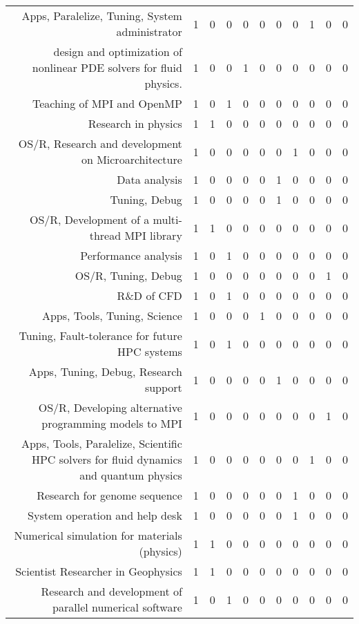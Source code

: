 {\begin{landscape}
\begin{longtable}[htb]{r|c|c|c|c|c|c|c|c|c|c}
{Apps, Paralelize, Tuning, System administrator} & 1 & 0 & 0 & 0 & 0 & 0 & 0 & 1 & 0 & 0 \\%
{design and optimization of nonlinear PDE solvers for fluid physics.} & 1 & 0 & 0 & 1 & 0 & 0 & 0 & 0 & 0 & 0 \\%
{Teaching of MPI and OpenMP} & 1 & 0 & 1 & 0 & 0 & 0 & 0 & 0 & 0 & 0 \\%
{Research in physics} & 1 & 1 & 0 & 0 & 0 & 0 & 0 & 0 & 0 & 0 \\%
{OS/R, Research and development on Microarchitecture} & 1 & 0 & 0 & 0 & 0 & 0 & 1 & 0 & 0 & 0 \\%
{Data analysis} & 1 & 0 & 0 & 0 & 0 & 1 & 0 & 0 & 0 & 0 \\%
{Tuning, Debug} & 1 & 0 & 0 & 0 & 0 & 1 & 0 & 0 & 0 & 0 \\%
{OS/R, Development of a  multi-thread MPI library} & 1 & 1 & 0 & 0 & 0 & 0 & 0 & 0 & 0 & 0 \\%
{Performance analysis} & 1 & 0 & 1 & 0 & 0 & 0 & 0 & 0 & 0 & 0 \\%
{OS/R, Tuning, Debug} & 1 & 0 & 0 & 0 & 0 & 0 & 0 & 0 & 1 & 0 \\%
{R\&D of CFD} & 1 & 0 & 1 & 0 & 0 & 0 & 0 & 0 & 0 & 0 \\%
{Apps, Tools, Tuning, Science} & 1 & 0 & 0 & 0 & 1 & 0 & 0 & 0 & 0 & 0 \\%
{Tuning, Fault-tolerance for future HPC systems} & 1 & 0 & 1 & 0 & 0 & 0 & 0 & 0 & 0 & 0 \\%
{Apps, Tuning, Debug, Research support} & 1 & 0 & 0 & 0 & 0 & 1 & 0 & 0 & 0 & 0 \\%
{OS/R, Developing alternative programming models to MPI} & 1 & 0 & 0 & 0 & 0 & 0 & 0 & 0 & 1 & 0 \\%
{Apps, Tools, Paralelize, Scientific HPC solvers for fluid dynamics and quantum physics} & 1 & 0 & 0 & 0 & 0 & 0 & 0 & 1 & 0 & 0 \\%
{Research for genome sequence} & 1 & 0 & 0 & 0 & 0 & 0 & 1 & 0 & 0 & 0 \\%
{System operation and help desk} & 1 & 0 & 0 & 0 & 0 & 0 & 1 & 0 & 0 & 0 \\%
{Numerical simulation for materials (physics)} & 1 & 1 & 0 & 0 & 0 & 0 & 0 & 0 & 0 & 0 \\%
{Scientist Researcher in Geophysics} & 1 & 1 & 0 & 0 & 0 & 0 & 0 & 0 & 0 & 0 \\%
{Research and development of parallel numerical software} & 1 & 0 & 1 & 0 & 0 & 0 & 0 & 0 & 0 & 0 \\%

\end{longtable}
\end{landscape}}
